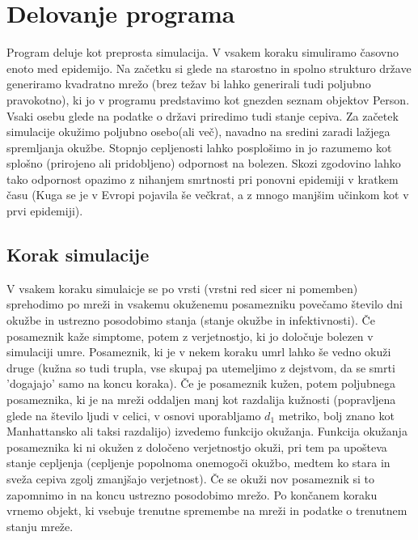 \documentclass[a4paper, 11pt]{article}
\begin{document}
\section*{Delovanje programa}
Program deluje kot preprosta simulacija. V vsakem koraku simuliramo časovno enoto 
 med epidemijo. Na začetku si glede na starostno in spolno strukturo države generiramo kvadratno mrežo (brez težav bi lahko generirali tudi poljubno pravokotno), ki jo v programu predstavimo kot gnezden seznam objektov Person. Vsaki osebu glede na podatke o državi priredimo tudi stanje cepiva. Za začetek simulacije okužimo poljubno osebo(ali več), navadno na sredini zaradi lažjega spremljanja okužbe. Stopnjo cepljenosti lahko posplošimo in jo razumemo kot splošno (prirojeno ali pridobljeno) odpornost na bolezen. Skozi zgodovino lahko tako odpornost opazimo z nihanjem smrtnosti pri ponovni epidemiji v kratkem času (Kuga se je v Evropi pojavila še večkrat, a z mnogo manjšim učinkom kot v prvi epidemiji).

\subsection*{Korak simulacije}
V vsakem koraku simulaicje se po vrsti (vrstni red sicer ni pomemben) sprehodimo po mreži in vsakemu okuženemu posamezniku povečamo število dni okužbe in ustrezno posodobimo stanja (stanje okužbe in infektivnosti). Če posameznik kaže simptome, potem z verjetnostjo, ki jo določuje bolezen v simulaciji umre. Posameznik, ki je v nekem koraku umrl lahko še vedno okuži druge (kužna so tudi trupla, vse skupaj pa utemeljimo z dejstvom, da se smrti 'dogajajo' samo na koncu koraka). Če je posameznik kužen, potem poljubnega posameznika, ki je na mreži oddaljen manj kot razdalija kužnosti (popravljena glede na število ljudi v celici, v osnovi uporabljamo $d_1$ metriko, bolj znano kot Manhattansko ali taksi razdalijo) izvedemo funkcijo okužanja. Funkcija okužanja posameznika ki ni okužen z določeno verjetnostjo okuži, pri tem pa upošteva stanje cepljenja (cepljenje popolnoma onemogoči okužbo, medtem ko stara in sveža cepiva zgolj zmanjšajo verjetnost). Če se okuži nov posameznik si to zapomnimo in na koncu ustrezno posodobimo mrežo. Po končanem koraku vrnemo objekt, ki vsebuje trenutne spremembe na mreži in podatke o trenutnem stanju mreže.

\end{document}
